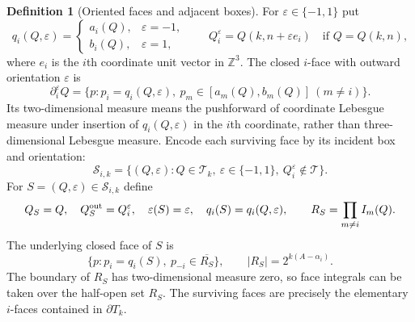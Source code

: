 \documentclass[12pt,reqno]{amsart}
\theoremstyle{plain}
\theoremstyle{definition}
\newtheorem{definition}[theorem]{Definition}
\theoremstyle{remark}
\numberwithin{equation}{section}
\newcommand{\Z}{\mathbb Z}
\newcommand{\T}{\mathcal T}
\begin{document}
\begin{definition}[Oriented faces and adjacent boxes]\label{def:faces}
For $\varepsilon\in\{-1,1\}$ put
\[
 q_i(Q,\varepsilon)=
 \begin{cases}a_i(Q),&\varepsilon=-1,\\b_i(Q),&\varepsilon=1,
 \end{cases}
 \qquad Q_i^\varepsilon=Q(k,n+\varepsilon e_i)
 \quad\text{if }Q=Q(k,n),
\]
where $e_i$ is the $i$th coordinate unit vector in $\Z^3$.
The closed $i$-face with outward orientation $\varepsilon$ is
\[
 \partial_i^\varepsilon Q
 =\{p:p_i=q_i(Q,\varepsilon),\ 
                  p_m\in[a_m(Q),b_m(Q)]\ (m\ne i)\}.
\]
Its two-dimensional measure means the pushforward of coordinate
Lebesgue measure under insertion of $q_i(Q,\varepsilon)$ in the
$i$th coordinate, rather than three-dimensional Lebesgue measure.
Encode each surviving face by its incident box and orientation:
\[
 \mathscr S_{i,k}
 =\{(Q,\varepsilon):Q\in\T_k,\ 
             \varepsilon\in\{-1,1\},\ Q_i^\varepsilon\notin\T\}.
\]
For $S=(Q,\varepsilon)\in\mathscr S_{i,k}$ define
\[
 Q_S=Q,\quad Q_S^{\rm out}=Q_i^\varepsilon,\quad
 \varepsilon(S)=\varepsilon,\quad q_i(S)=q_i(Q,\varepsilon),
 \qquad R_S=\prod_{m\ne i}I_m(Q).
\]
The underlying closed face of $S$ is
\[
 \{p:p_i=q_i(S),\ p_{-i}\in\overline{R_S}\},\qquad
 |R_S|=2^{k(A-\alpha_i)}.
\]
The boundary of $R_S$ has two-dimensional measure zero, so face
integrals can be taken over the half-open set $R_S$. The surviving
faces are precisely the elementary $i$-faces contained in
$\partial T_k$.
\end{definition}
\end{document}
